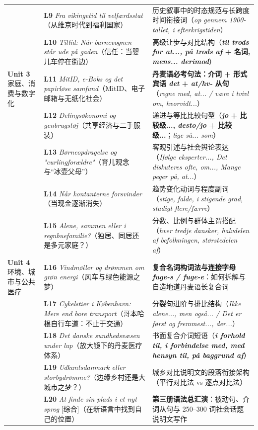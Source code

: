 \documentclass[10.5pt, a4paper]{ctexart}
\begin{document}
{\begin{longtable}{@{} >{\raggedright\arraybackslash}p{2.65cm} >{\raggedright\arraybackslash}p{5.7cm} >{\raggedright\arraybackslash}p{7.25cm} @{}}
 & \textbf{L9} \textit{Fra vikingetid til velfærdsstat}（从维京时代到福利国家） & 历史叙事中的时态规范与长跨度时间衔接词（\textit{op gennem 1900-tallet, i efterkrigstiden}） \\
 & \textbf{L10} \textit{Tillid: Når barnevognen står ude på gaden}（信任：当婴儿车停在街边） & 高级让步与对比结构（\textbf{\textit{til trods for at..., på trods af} + 名词, \textit{mens... derimod}}） \\
\midrule
\textbf{Unit 3}\newline 家庭、消费与\newline 数字化 & \textbf{L11} \textit{MitID, e-Boks og det papirløse samfund}（MitID、电子邮箱与无纸化社会） & \textbf{丹麦语必考句法：介词 + 形式宾语 \textit{det} + \textit{at/hv-} 从句}（\textit{regne med, at... / være i tvivl om, hvorvidt...}） \\
 & \textbf{L12} \textit{Delingsøkonomi og genbrugstøj}（共享经济与二手服装） & 递进与等比比较句型（\textbf{\textit{jo} + 比较级..., \textit{desto/jo} + 比较级...}；\textit{lige så... som}） \\
 & \textbf{L13} \textit{Børneopdragelse og "curlingforældre"}（育儿观念与“冰壶父母”） & 客观引述与社会舆论表达（\textit{Ifølge eksperter..., Det diskuteres ofte, om..., Mange peger på, at...}） \\
 & \textbf{L14} \textit{Når kontanterne forsvinder}（当现金逐渐消失） & 趋势变化动词与程度副词（\textit{stige, falde, i stigende grad, stadigt flere/færre}） \\
 & \textbf{L15} \textit{Alene, sammen eller i regnbuefamilie?}（独居、同居还是多元家庭？） & 分数、比例与群体主谓搭配（\textit{hver tredje dansker, halvdelen af befolkningen, størstedelen af}） \\
\midrule
\textbf{Unit 4}\newline 环境、城市与\newline 公共医疗 & \textbf{L16} \textit{Vindmøller og drømmen om grøn energi}（风车与绿色能源之梦） & \textbf{复合名词构词法与连接字母 \textit{fuge-s / fuge-e}}：如何拆解与自造地道丹麦语长复合词 \\
 & \textbf{L17} \textit{Cykelstier i København: Mere end bare transport}（哥本哈根自行车道：不止于交通） & 分裂句进阶与排比结构（\textit{Ikke alene..., men også... / Det er først og fremmest..., der...}） \\
 & \textbf{L18} \textit{Det danske sundhedsvæsen under lup}（放大镜下的丹麦医疗体系） & 书面复合介词短语（\textbf{\textit{i forhold til, i forbindelse med, med hensyn til, på baggrund af}}） \\
 & \textbf{L19} \textit{Udkantsdanmark eller storbydrømme?}（边缘乡村还是大城市之梦？） & 城乡对比说明文的段落衔接架构（平行对比法 vs 逐点对比法） \\
 & \textbf{L20} \textit{At finde sin plads i et nyt sprog} [综合]（在新语言中找到自己的位置） & \textbf{第三册语法总汇演}：被动句、介词从句与 250--300 词社会话题说明文写作 \\
\end{longtable}
}
\end{document}
